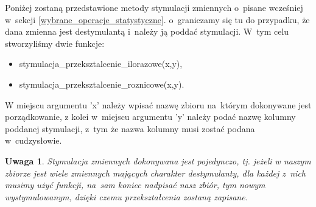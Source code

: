\documentclass[12pt,a4paper]{report}
\newtheorem{uwaga}{Uwaga}
\begin{document}
{Poniżej zostaną przedstawione metody stymulacji zmiennych o~pisane wcześniej w~sekcji \ref{wybrane_operacje_statystyczne}. o~graniczamy
się tu do przypadku, że dana zmienna jest destymulantą i~należy
ją poddać stymulacji. W~tym celu stworzyliśmy dwie funkcje:
\begin{itemize}
\item stymulacja\_przeksztalcenie\_ilorazowe(x,y),
\item stymulacja\_przeksztalcenie\_roznicowe(x,y).
\end{itemize}
W miejscu argumentu 'x'
należy wpisać nazwę zbioru na~którym dokonywane jest porządkowanie, z
kolei w~miejscu argumentu 'y' należy podać nazwę kolumny poddanej
stymulacji, z~tym że nazwa kolumny musi zostać podana w~cudzysłowie.

\begin{Shaded}
\begin{Highlighting}[]
\NormalTok{\{}
  \NormalTok{:}
  \NormalTok{\{}
    \NormalTok{x[i,}\NormalTok{(}\NormalTok{(x)==y)]=}\NormalTok{/x[i,}\NormalTok{(}\NormalTok{(x)==y)]}
  \NormalTok{\}}
\NormalTok{\}}
\end{Highlighting}
\end{Shaded}

\begin{Shaded}
\begin{Highlighting}[]
\NormalTok{\{}
  \NormalTok{(x[}\NormalTok{(}\NormalTok{(x)==y)])}
  \NormalTok{:}
  \NormalTok{\{}
    \NormalTok{x[i,}\NormalTok{(}\NormalTok{(x)==y)]=max_wartosc-x[i,}\NormalTok{(}\NormalTok{(x)==y)]}
  \NormalTok{\}}
\NormalTok{\}}
\end{Highlighting}
\end{Shaded}

\begin{uwaga} Stymulacja zmiennych dokonywana jest pojedynczo, tj. jeżeli w
naszym zbiorze jest wiele zmiennych mających charakter destymulanty, dla
każdej z~nich musimy użyć funkcji, na~sam koniec nadpisać nasz zbiór,
tym nowym wystymulowanym, dzięki czemu przekształcenia zostaną zapisane.
\end{uwaga}

}
\end{document}
